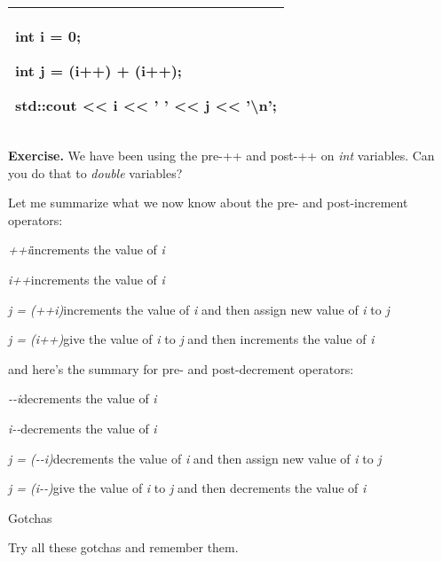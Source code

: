 \documentclass[
]{article}
\begin{document}
\begin{longtable}[]{@{}l@{}}
\toprule
\endhead
\begin{minipage}[t]{0.97\columnwidth}\raggedright
int i = 0;

int j = (i++) + (i++);

std::cout \textless\textless{} i \textless\textless{} ' '
\textless\textless{} j \textless\textless{} '\textbackslash n';\strut
\end{minipage}\tabularnewline
\bottomrule
\end{longtable}

\textbf{Exercise.} We have been using the pre-++ and post-++ on
\emph{int} variables. Can you do that to \emph{double} variables?

Let me summarize what we now know about the pre- and post-increment
operators:

\emph{++i}increments the value of \emph{i}

\emph{i++}increments the value of \emph{i}

\emph{j = (++i)}increments the value of \emph{i} and then assign new
value of \emph{i} to \emph{j}

\emph{j = (i++)}give the value of \emph{i} to \emph{j} and then
increments the value of \emph{i}

and here's the summary for pre- and post-decrement operators:

\emph{-\/-i}decrements the value of \emph{i}

\emph{i-\/-}decrements the value of \emph{i}

\emph{j = (-\/-i)}decrements the value of \emph{i} and then assign new
value of \emph{i} to \emph{j}

\emph{j = (i-\/-)}give the value of \emph{i} to \emph{j} and then
decrements the value of \emph{i}

Gotchas

Try all these gotchas and remember them.

\begin{longtable}[]{@{}@{}}
\toprule
\endhead
\bottomrule
\end{longtable}

\begin{longtable}[]{@{}@{}}
\toprule
\endhead
\bottomrule
\end{longtable}

\begin{longtable}[]{@{}@{}}
\toprule
\endhead
\bottomrule
\end{longtable}
\end{document}
